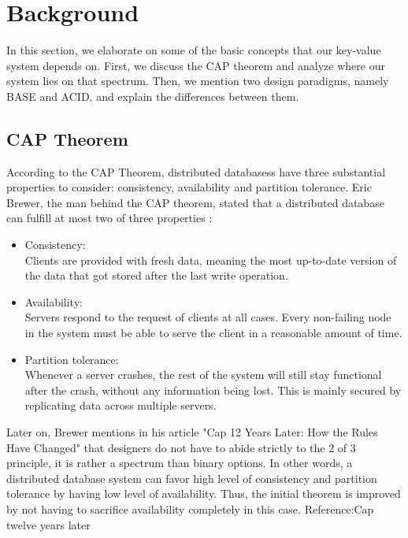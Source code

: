 \section{Background}
\label{sec:background}
In this section, we elaborate on some of the basic concepts that our key-value system depends on. First, we discuss the CAP theorem and analyze where our system lies on that spectrum. Then, we mention two design paradigms, namely BASE and ACID, and explain the differences between them.

\subsection{CAP Theorem}
\label{sec:background_cap} 
According to the CAP Theorem, distributed databasess have three substantial properties to consider: consistency, availability and partition tolerance. Eric Brewer, the man behind the CAP theorem, stated that a distributed database can fulfill at most two of three properties \cite{brewer2000cap}:

\begin{itemize}
  \item Consistency: \\
  Clients are provided with fresh data, meaning the most up-to-date version of the data that got stored after the last write operation.
  \item Availability: \\
  Servers respond to the request of clients at all cases. Every non-failing node in the system must be able to serve the client in a reasonable amount of time.
  \item Partition tolerance: \\
  Whenever a server crashes, the rest of the system will still stay functional after the crash, without any information being lost. This is mainly secured by replicating data across multiple servers.
\end{itemize}

Later on, Brewer mentions in his article "Cap 12 Years Later: How the Rules Have Changed" that designers do not have to abide strictly to the 2 of 3 principle, it is rather a spectrum than binary options. In other words, a distributed database system can favor high level of consistency and partition tolerance by having low level of availability. Thus, the initial theorem is improved by not having to sacrifice availability completely in this case. Reference:Cap twelve years later

